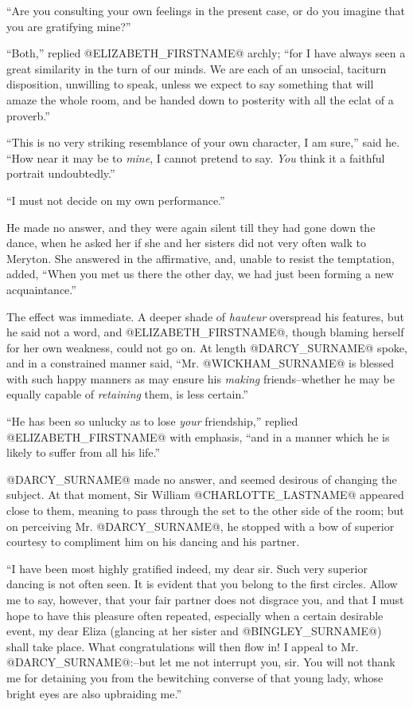 ``Are you consulting your own feelings in the present case, or do you
imagine that you are gratifying mine?''

``Both,'' replied @ELIZABETH_FIRSTNAME@ archly; ``for I have always seen a great
similarity in the turn of our minds. We are each of an unsocial,
taciturn disposition, unwilling to speak, unless we expect to say
something that will amaze the whole room, and be handed down to
posterity with all the eclat of a proverb.''

``This is no very striking resemblance of your own character, I am sure,''
said he. ``How near it may be to \textit{mine}, I cannot pretend to say. \textit{You}
think it a faithful portrait undoubtedly.''

``I must not decide on my own performance.''

He made no answer, and they were again silent till they had gone down
the dance, when he asked her if she and her sisters did not very often
walk to Meryton. She answered in the affirmative, and, unable to resist
the temptation, added, ``When you met us there the other day, we had just
been forming a new acquaintance.''

The effect was immediate. A deeper shade of \textit{hauteur} overspread his
features, but he said not a word, and @ELIZABETH_FIRSTNAME@, though blaming herself
for her own weakness, could not go on. At length @DARCY_SURNAME@ spoke, and in a
constrained manner said, ``Mr. @WICKHAM_SURNAME@ is blessed with such happy manners
as may ensure his \textit{making} friends--whether he may be equally capable of
\textit{retaining} them, is less certain.''

``He has been so unlucky as to lose \textit{your} friendship,'' replied @ELIZABETH_FIRSTNAME@
with emphasis, ``and in a manner which he is likely to suffer from all
his life.''

@DARCY_SURNAME@ made no answer, and seemed desirous of changing the subject. At
that moment, Sir William @CHARLOTTE_LASTNAME@ appeared close to them, meaning to pass
through the set to the other side of the room; but on perceiving Mr.
@DARCY_SURNAME@, he stopped with a bow of superior courtesy to compliment him on
his dancing and his partner.

``I have been most highly gratified indeed, my dear sir. Such very
superior dancing is not often seen. It is evident that you belong to the
first circles. Allow me to say, however, that your fair partner does not
disgrace you, and that I must hope to have this pleasure often repeated,
especially when a certain desirable event, my dear Eliza (glancing at
her sister and @BINGLEY_SURNAME@) shall take place. What congratulations will then
flow in! I appeal to Mr. @DARCY_SURNAME@:--but let me not interrupt you, sir. You
will not thank me for detaining you from the bewitching converse of that
young lady, whose bright eyes are also upbraiding me.''

